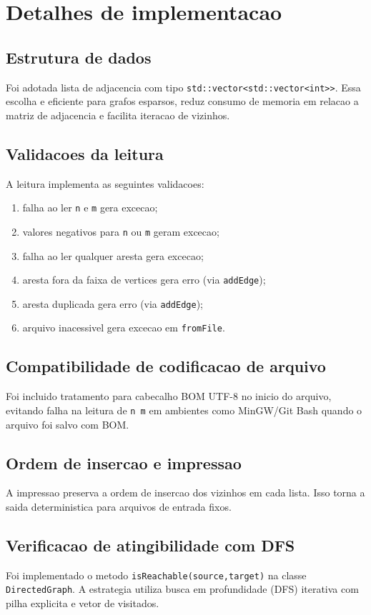 \documentclass[12pt,a4paper]{article}
\begin{document}
\section{Detalhes de implementacao}
\subsection{Estrutura de dados}
Foi adotada lista de adjacencia com tipo \texttt{std::vector<std::vector<int>>}. Essa escolha e eficiente para grafos esparsos, reduz consumo de memoria em relacao a matriz de adjacencia e facilita iteracao de vizinhos.

\subsection{Validacoes da leitura}
A leitura implementa as seguintes validacoes:
\begin{enumerate}
    \item falha ao ler \texttt{n} e \texttt{m} gera excecao;
    \item valores negativos para \texttt{n} ou \texttt{m} geram excecao;
    \item falha ao ler qualquer aresta gera excecao;
    \item aresta fora da faixa de vertices gera erro (via \texttt{addEdge});
    \item aresta duplicada gera erro (via \texttt{addEdge});
    \item arquivo inacessivel gera excecao em \texttt{fromFile}.
\end{enumerate}

\subsection{Compatibilidade de codificacao de arquivo}
Foi incluido tratamento para cabecalho BOM UTF-8 no inicio do arquivo, evitando falha na leitura de \texttt{n m} em ambientes como MinGW/Git Bash quando o arquivo foi salvo com BOM.

\subsection{Ordem de insercao e impressao}
A impressao preserva a ordem de insercao dos vizinhos em cada lista. Isso torna a saida deterministica para arquivos de entrada fixos.

\subsection{Verificacao de atingibilidade com DFS}
Foi implementado o metodo \texttt{isReachable(source,target)} na classe \texttt{DirectedGraph}. A estrategia utiliza busca em profundidade (DFS) iterativa com pilha explicita e vetor de visitados.
\end{document}
